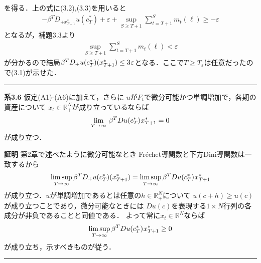 \documentclass[a4paper,11pt]{jsarticle}
\begin{document}
を得る．上の式に(3.2)\hspace*{.2mm},\hspace*{1.2mm}(3.3)を用いると
\begin{align*}
        -\beta^T D_{+x_{T+1}^*}u(c_T^*)+\varepsilon+\sup_{S \geq T+1} \sum_{t=T+1}^S m_t(\ell)
			\geq -\varepsilon
\end{align*}
となるが，補題3.3より
\begin{align*}
	\sup_{S \geq T+1} \sum_{t=T+1}^S m_t(\ell)<\varepsilon
\end{align*}
が分かるので結局$\beta^T D_{+}u(c_T^*)(x_{T+1}^*)\leq 3\hspace*{.2mm}\varepsilon
$となる．ここで$T\geq T_\varepsilon$は任意だったので(3.1)が示せた．\hfill \rule[-2pt]{5pt}{10pt}

\vspace{7mm}

\vspace{7mm}
\noindent \textbf{系3.6}\hspace*{.7mm} 仮定(A1)-(A6)に加えて，さらに
$u$が$F_t$で微分可能かつ単調増加で，各期の資産について
$x_{t}\in \mathbb{R}^N_+$が成り立っているならば
\begin{align*}
	\lim_{T \to \infty}\, \beta^T Du(c_T^*)\hspace{.2mm}x_{T+1}^*= 0
\end{align*}
が成り立つ．
\bigskip

\noindent \textbf{証明}\hspace{.7mm} 第2章で述べたように微分可能なとき
Fr\'{e}chet導関数と下方Dini導関数は一致するから
\begin{align*}
	\limsup_{T\to \infty}\beta^T D_+u(c_T^*)(x_{T+1}^*)=\limsup_{T\to \infty}\beta^T Du(c_T^*)\hspace{.2mm}x_{T+1}^*
\end{align*}
が成り立つ．$u$が単調増加であるとは任意の$h \in \mathbb{R}_+^N$について
$u(c+h)\geq u(c)$が成り立つことであり，微分可能なときには
$Du(c)$を表現する$1\times N$行列の各成分が非負であることと同値である．
よって常に$x_t \in \mathbb{R}^N$ならば
\begin{align*}
	\limsup_{T\to \infty}\beta^T Du(c_T^*)\hspace{.2mm}x_{T+1}^*\geq 0
\end{align*}
が成り立ち，示すべきものが従う．\hfill \rule[-2pt]{5pt}{10pt}
\end{document}
